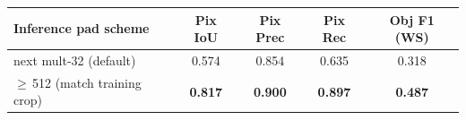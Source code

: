 \begin{tabular}{lcccc}
\toprule
Inference pad scheme & Pix IoU & Pix Prec & Pix Rec & Obj F1 (WS) \\
\midrule
next mult-32 (default)            & 0.574 & 0.854 & 0.635 & 0.318 \\
$\geq$\,512 (match training crop) & \textbf{0.817} & \textbf{0.900} & \textbf{0.897} & \textbf{0.487} \\
\bottomrule
\end{tabular}
